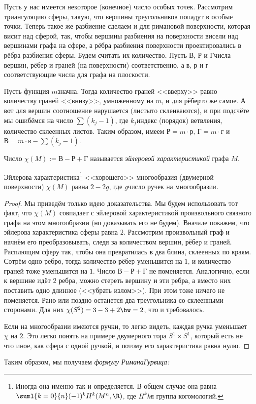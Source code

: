 \documentclass[a4paper]{article}
\begin{document}
Пусть у нас имеется некоторое (конечное) число особых точек. Рассмотрим
триангуляцию сферы, такую, что вершины треугольников
попадут в особые точки. Теперь такое же разбиение сделаем и для римановой поверхности, которая
висит над сферой, так, чтобы вершины разбиения на поверхности висели над вершинами графа на сфере,
а рёбра разбиения поверхности проектировались в рёбра разбиения сферы. Будем считать их количество.
Пусть $В$, $Р$ и $Г$\т числа вершин, рёбер и граней (на поверхности) соответственно, а $в$, $р$ и $г$\т
соответствующие числа для графа на плоскости.

Пусть функция $m$\д значна. Тогда количество граней <<вверху>> равно количеству граней <<внизу>>, умноженному на $m$,
и для рёбер\т то же самое. А вот для вершин соотношение нарушается (листы\д то склеиваются),
и при подсчёте мы ошибёмся на число $\sum (k_j - 1)$, где $k_j$\т индекс (порядок) ветвления, 
количество склеенных листов. Таким образом, имеем $Р=m\cdot р$, $Г = m \cdot г$ и $В = m\cdot в - \sum (k_j-1)$.

\begin{df}
Число $\chi(M) :=В-Р+Г$ называется \emph{эйлеровой характеристикой} графа $M$.
\end{df}

\begin{stm}
Эйлерова характеристика\footnote{Иногда она именно так и определяется. В общем случае она равна $\suml{k=0}{n} (-1)^k H^k(M^n,\R)$,
где $H^k$\т $k$\д я группа когомологий.} <<хорошего>> многообразия (двумерной поверхности)
$\chi(M)$ равна $2-2g$, где $g$\т число ручек на многообразии.
\end{stm}
\begin{proof}
Мы приведём только идею доказательства. Мы будем использовать тот факт, что $\chi(M)$ совпадает с эйлеровой
характеристикой произвольного связного графа на этом многообразии (но доказывать его не будем).
Вначале покажем, что эйлерова характеристика сферы равна $2$. Рассмотрим произвольный граф и начнём его преобразовывать,
следя за количеством вершин, рёбер и граней. Расплющим сферу так, чтобы она превратилась в два блина, склеенных по краям.
Сотрём одно ребро, тогда количество рёбер уменьшится на $1$, и количество граней тоже уменьшится на $1$. Число $В - Р+Г$
не поменяется. Аналогично, если к вершине идёт 2 ребра, можно стереть вершину и эти ребра, а вместо них поставить
одно длинное (<<убрать излом>>). При этом тоже ничего не поменяется. Рано или поздно останется два треугольника со склеенными
сторонами. Для них $\chi(S^2) = 3 - 3 + 2\bw=2$, что и требовалось.

Если на многообразии имеются ручки, то легко видеть, каждая ручка уменьшает $\chi$ на $2$. Это легко понять на примере
двумерного тора $S^1 \times S^1$, который есть не что иное, как сфера с одной ручкой, и потому его характеристика равна нулю.
\end{proof}

Таким образом, мы получаем \emph{формулу Римана\ч Гурвица:}
\end{document}
